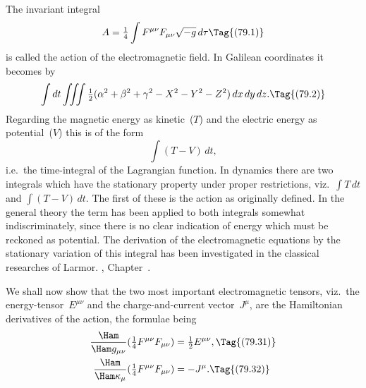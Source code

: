 \documentclass[12pt]{book}
\begin{document}
%
%
%

The invariant integral
\[
A = \tfrac{1}{4} \int F^{\mu\nu} F_{\mu\nu} \sqrt{-g}\, d\tau
\Tag{(79.1)}
\]
is called the action of the electromagnetic field. In Galilean coordinates it
becomes by~
\[
\int dt \iiint \tfrac{1}{2}(\alpha^{2} + \beta^{2} + \gamma^{2} - X^{2} - Y^{2} - Z^{2})\, dx\, dy\, dz.
\Tag{(79.2)}
\]
Regarding the magnetic energy as kinetic~($T$) and the electric energy as
potential~($V$) this is of the form
\[
\int (T - V)\, dt,
\]
i.e.\ the time-integral of the Lagrangian function\footnotemark.\footnotetext
  {In dynamics there are two integrals which have the stationary property under proper restrictions,
  viz.\ $\int T\, dt$ and $\int (T - V)\, dt$. The first of these is the action as originally defined. In the
  general theory the term has been applied to both integrals somewhat indiscriminately, since there
  is no clear indication of energy which must be reckoned as potential.}
The derivation of the
electromagnetic equations by the stationary variation of this integral has been
investigated in the classical researches of Larmor\footnotemark.\footnotetext
  {, Chapter~.}

We shall now show that the two most important electromagnetic tensors,
viz.\ the energy-tensor~$E^{\mu\nu}$ and the charge-and-current vector~$J^{\mu}$, are the
Hamiltonian derivatives of the action, the formulae being
\begin{align*}
  \frac{\Ham}{\Ham g_{\mu\nu}} (\tfrac{1}{4}F^{\mu\nu} F_{\mu\nu})
  &= \tfrac{1}{2} E^{\mu\nu},
  \Tag{(79.31)} \\
  \frac{\Ham}{\Ham \kappa_{\mu}} (\tfrac{1}{4}F^{\mu\nu} F_{\mu\nu})
  &= -J^{\mu}.
  \Tag{(79.32)}
\end{align*}
\end{document}
